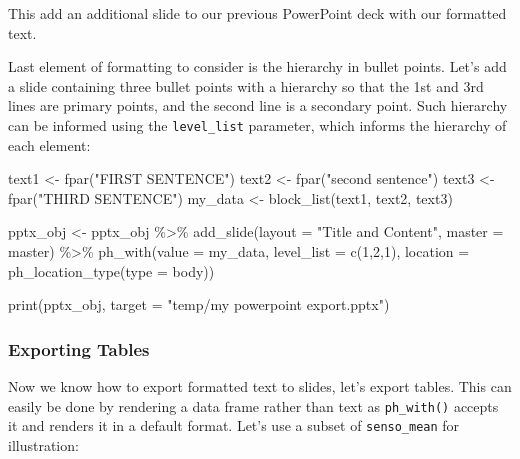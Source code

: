 \documentclass[
]{book}
\newenvironment{Shaded}{\begin{snugshade}}{\end{snugshade}}
\newcommand{\AttributeTok}[1]{\textcolor[rgb]{0.77,0.63,0.00}{#1}}
\newcommand{\DecValTok}[1]{\textcolor[rgb]{0.00,0.00,0.81}{#1}}
\newcommand{\FunctionTok}[1]{\textcolor[rgb]{0.00,0.00,0.00}{#1}}
\newcommand{\NormalTok}[1]{#1}
\newcommand{\OtherTok}[1]{\textcolor[rgb]{0.56,0.35,0.01}{#1}}
\newcommand{\SpecialCharTok}[1]{\textcolor[rgb]{0.00,0.00,0.00}{#1}}
\newcommand{\StringTok}[1]{\textcolor[rgb]{0.31,0.60,0.02}{#1}}
\begin{document}
This add an additional slide to our previous PowerPoint deck with our formatted text.

Last element of formatting to consider is the hierarchy in bullet points. Let's add a slide containing three bullet points with a hierarchy so that the 1st and 3rd lines are primary points, and the second line is a secondary point.
Such hierarchy can be informed using the \texttt{level\_list} parameter, which informs the hierarchy of each element:

\begin{Shaded}
\begin{Highlighting}[]
\NormalTok{text1 }\OtherTok{\textless{}{-}} \FunctionTok{fpar}\NormalTok{(}\StringTok{"FIRST SENTENCE"}\NormalTok{)}
\NormalTok{text2 }\OtherTok{\textless{}{-}} \FunctionTok{fpar}\NormalTok{(}\StringTok{"second sentence"}\NormalTok{)}
\NormalTok{text3 }\OtherTok{\textless{}{-}} \FunctionTok{fpar}\NormalTok{(}\StringTok{"THIRD SENTENCE"}\NormalTok{)}
\NormalTok{my\_data }\OtherTok{\textless{}{-}} \FunctionTok{block\_list}\NormalTok{(text1, text2, text3)}

\NormalTok{pptx\_obj }\OtherTok{\textless{}{-}}\NormalTok{ pptx\_obj }\SpecialCharTok{\%\textgreater{}\%}
  \FunctionTok{add\_slide}\NormalTok{(}\AttributeTok{layout =} \StringTok{"Title and Content"}\NormalTok{, }\AttributeTok{master =}\NormalTok{ master) }\SpecialCharTok{\%\textgreater{}\%} 
  \FunctionTok{ph\_with}\NormalTok{(}\AttributeTok{value =}\NormalTok{ my\_data, }\AttributeTok{level\_list =} \FunctionTok{c}\NormalTok{(}\DecValTok{1}\NormalTok{,}\DecValTok{2}\NormalTok{,}\DecValTok{1}\NormalTok{), }\AttributeTok{location =} \FunctionTok{ph\_location\_type}\NormalTok{(}\AttributeTok{type =} \StringTok{\textquotesingle{}body\textquotesingle{}}\NormalTok{))}

\FunctionTok{print}\NormalTok{(pptx\_obj, }\AttributeTok{target =} \StringTok{"temp/my powerpoint export.pptx"}\NormalTok{)}
\end{Highlighting}
\end{Shaded}

\hypertarget{exporting-tables}{%
\subsubsection{Exporting Tables}\label{exporting-tables}}

Now we know how to export formatted text to slides, let's export tables. This can easily be done by rendering a data frame rather than text as \texttt{ph\_with()} accepts it and renders it in a default format. Let's use a subset of \texttt{senso\_mean} for illustration:
\end{document}
